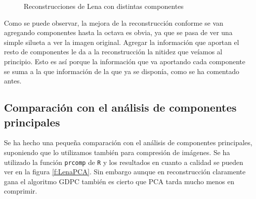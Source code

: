 \begin{figure}[]
 \centering
 \caption{Reconstrucciones de Lena con distintas componentes}
 \label{f:RLenaC4}
\end{figure}

Como se puede observar, la mejora de la reconstrucción conforme se van agregando componentes hasta la octava es obvia, ya que se pasa de ver una simple silueta a ver la imagen original. Agregar la información que aportan el resto de componentes le da a la reconstrucción la nitidez que veíamos al principio. Esto es así porque la información que va aportando cada componente se suma a la que información de la que ya se disponía, como se ha comentado antes.\\

\subsection{Comparación con el análisis de componentes principales}
Se ha hecho una pequeña comparación con el análisis de componentes principales, suponiendo que lo utilizamos también para compresión de imágenes. Se ha utilizado la función \texttt{prcomp} de \texttt{R} y los resultados en cuanto a calidad se pueden ver en la figura \ref{f:LenaPCA}. Sin embargo aunque en reconstrucción claramente gana el algoritmo GDPC también es cierto que PCA tarda mucho menos en comprimir.\\

